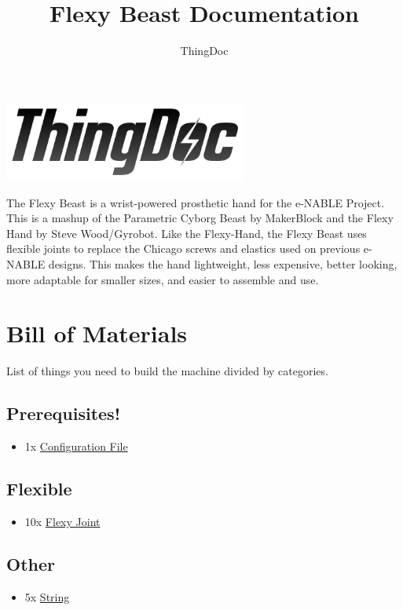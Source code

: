 \documentclass[11pt]{article}
\title{Flexy Beast Documentation}
\author{ThingDoc}
\begin{document}
\maketitle
\begin{center}
\includegraphics[width=8cm]{logo.png}
\end{center}
The Flexy Beast is a wrist-powered prosthetic hand for the e-NABLE Project. This is a mashup of the Parametric Cyborg Beast by MakerBlock and the Flexy Hand by Steve Wood/Gyrobot. Like the Flexy-Hand, the Flexy Beast uses flexible joints to replace the Chicago screws and elastics used on previous e-NABLE designs. This makes the hand lightweight, less expensive, better looking, more adaptable for smaller sizes, and easier to assemble and use.

\newpage

\tableofcontents

\newpage

\section{Bill of Materials}
List of things you need to build the machine divided by categories.

\subsection{Prerequisites!}
\begin{itemize}
\item 1x \hyperlink{thing_config\_file}{Configuration File}
\end{itemize}

\subsection{Flexible}
\begin{itemize}
\item 10x \hyperlink{thing_flexy\_joint}{Flexy Joint}
\end{itemize}

\subsection{Other}
\begin{itemize}
\item 5x \hyperlink{thing_string}{String}
\end{itemize}
\end{document}
